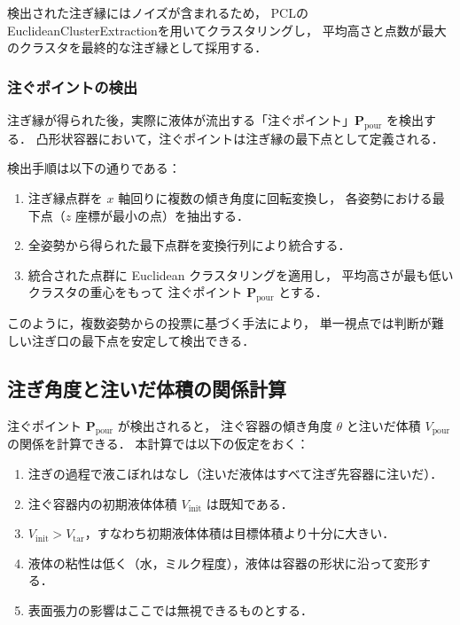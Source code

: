 検出された注ぎ縁にはノイズが含まれるため，
PCLのEuclideanClusterExtractionを用いてクラスタリングし，
平均高さと点数が最大のクラスタを最終的な注ぎ縁として採用する．

\subsubsection{注ぐポイントの検出}

注ぎ縁が得られた後，実際に液体が流出する「注ぐポイント」$\mathbf{P}_{\mathrm{pour}}$
を検出する．
凸形状容器において，注ぐポイントは注ぎ縁の最下点として定義される．

検出手順は以下の通りである：

\begin{enumerate}
  \item 注ぎ縁点群を $x$ 軸回りに複数の傾き角度に回転変換し，
        各姿勢における最下点（$z$ 座標が最小の点）を抽出する．
  \item 全姿勢から得られた最下点群を変換行列により統合する．
  \item 統合された点群に Euclidean クラスタリングを適用し，
        平均高さが最も低いクラスタの重心をもって
        注ぐポイント $\mathbf{P}_{\mathrm{pour}}$ とする．
\end{enumerate}

このように，複数姿勢からの投票に基づく手法により，
単一視点では判断が難しい注ぎ口の最下点を安定して検出できる．

\subsection{注ぎ角度と注いだ体積の関係計算}
\label{sec:pour_angle_volume}

注ぐポイント $\mathbf{P}_{\mathrm{pour}}$ が検出されると，
注ぐ容器の傾き角度 $\theta$ と注いだ体積 $V_{\mathrm{pour}}$ の関係を計算できる．
本計算では以下の仮定をおく：

\begin{enumerate}
  \item 注ぎの過程で液こぼれはなし（注いだ液体はすべて注ぎ先容器に注いだ）．
  \item 注ぐ容器内の初期液体体積 $V_{\mathrm{init}}$ は既知である．
  \item $V_{\mathrm{init}} > V_{\mathrm{tar}}$，すなわち初期液体体積は目標体積より十分に大きい．
  \item 液体の粘性は低く（水，ミルク程度），液体は容器の形状に沿って変形する．
  \item 表面張力の影響はここでは無視できるものとする．
\end{enumerate}

